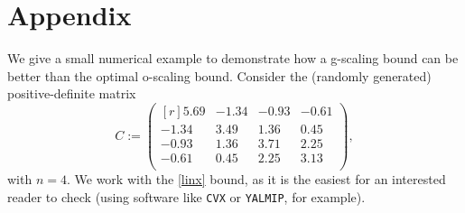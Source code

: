 \documentclass[smallextended]{svjour3hack}       %
\DeclareMathOperator{\Diag}{Diag}
\begin{document}
{{%



\appendix
\section*{Appendix}\label{sec:App}

We give a small numerical example to demonstrate how a g-scaling bound
can be better than the optimal o-scaling bound. Consider the (randomly generated) positive-definite matrix
\begin{equation*}
    C := \begin{pmatrix*}[r]
         5.69 & -1.34 & -0.93 & -0.61 \\
         -1.34 & 3.49 & 1.36 & 0.45 \\
         -0.93 & 1.36 & 3.71 & 2.25 \\
         -0.61 & 0.45 & 2.25 & 3.13 \\
    \end{pmatrix*},
\end{equation*}
with $n=4$. We work with the \ref{linx} bound, as it is the  easiest for an interested reader to check (using software like \texttt{CVX} or \texttt{YALMIP}, for example).

}}
\end{document}
